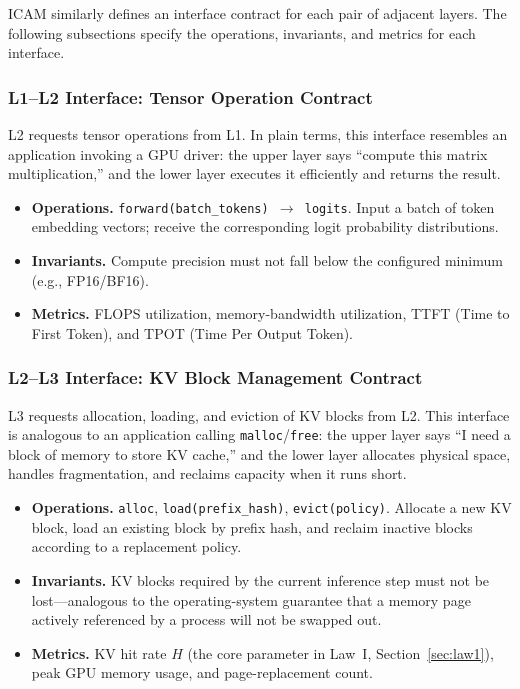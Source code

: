 \documentclass[11pt,a4paper]{article}
\begin{document}
ICAM similarly defines an interface contract for each pair of adjacent layers. The following subsections specify the operations, invariants, and metrics for each interface.

\subsubsection{L1--L2 Interface: Tensor Operation Contract}

L2 requests tensor operations from L1. In plain terms, this interface resembles an application invoking a GPU driver: the upper layer says ``compute this matrix multiplication,'' and the lower layer executes it efficiently and returns the result.

\begin{itemize}[nosep]
\item \textbf{Operations.}
\texttt{forward(batch\_tokens) $\to$ logits}.
Input a batch of token embedding vectors; receive the corresponding logit probability distributions.
\item \textbf{Invariants.}
Compute precision must not fall below the configured minimum (e.g., FP16/BF16).
\item \textbf{Metrics.}
FLOPS utilization, memory-bandwidth utilization, TTFT (Time to First Token), and TPOT (Time Per Output Token).
\end{itemize}

\subsubsection{L2--L3 Interface: KV Block Management Contract}

L3 requests allocation, loading, and eviction of KV blocks from L2. This interface is analogous to an application calling \texttt{malloc}/\texttt{free}: the upper layer says ``I need a block of memory to store KV cache,'' and the lower layer allocates physical space, handles fragmentation, and reclaims capacity when it runs short.

\begin{itemize}[nosep]
\item \textbf{Operations.}
\texttt{alloc}, \texttt{load(prefix\_hash)}, \texttt{evict(policy)}.
Allocate a new KV block, load an existing block by prefix hash, and reclaim inactive blocks according to a replacement policy.
\item \textbf{Invariants.}
KV blocks required by the current inference step must not be lost---analogous to the operating-system guarantee that a memory page actively referenced by a process will not be swapped out.
\item \textbf{Metrics.}
KV hit rate $H$ (the core parameter in Law~I, Section~\ref{sec:law1}), peak GPU memory usage, and page-replacement count.
\end{itemize}
\end{document}
